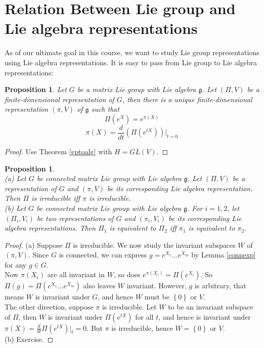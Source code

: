 \documentclass[11pt]{book}
\newtheorem{proposition}[theorem]{Proposition}
\newcommand{\mf}[1]{\mathfrak{#1}}
\begin{document}
\section{Relation Between Lie group and Lie algebra representations}
As of our ultimate goal in this course, we want to study Lie group representations using Lie algebra representations. It is easy to pass from Lie group to Lie algebra representations:
\begin{proposition}
Let $G$ be a matrix Lie group with Lie algebra $\mf{g}$. Let $(\Pi,V)$ be a finite-dimensional representation of $G$, then there is a unique finite-dimensional representation $(\pi,V)$ of $\mf{g}$ such that
$$\Pi(e^X) = e^{\pi(X)}$$
$$\pi(X) = \frac{d}{dt}(\Pi(e^{tX}))  \Big|_{t = 0}$$
\end{proposition}
\begin{proof}
Use Theorem \ref{gptoalg} with $H = GL(V)$.
\end{proof}
\begin{proposition} \mbox{}\\
(a) Let $G$ be connected matrix Lie group with Lie algebra $\mf{g}$. Let $(\Pi,V)$ be a representation of $G$ and $(\pi,V)$ be its corresponding Lie algebra representation. Then $\Pi$ is irreducible iff $\pi$ is irreducible.\\
(b) Let $G$ be connected matrix Lie group with Lie algebra $\mf{g}$. For $i = 1,2$, let $(\Pi_i,V_i)$ be two representations of $G$ and $(\pi_i,V_i)$ be its corresponding Lie algebra representations. Then $\Pi_1$ is equivalent to $\Pi_2$ iff $\pi_1$ is equivalent to $\pi_2$.
\end{proposition}
\begin{proof}
(a) Suppose $\Pi$ is irreducible. We now study the invariant subspaces $W$ of $(\pi,V)$. Since $G$ is connected, we can express $g = e^{X_1}\dots e^{X_m}$ by Lemma \ref{connexp} for any $g \in G$. \\
Now $\pi(X_i)$ are all invariant in $W$, so does $e^{\pi(X_i)} = \Pi(e^{X_i})$. So $\Pi(g) = \Pi(e^{X_1}\dots e^{X_m})$ also leaves $W$ invariant. However, $g$ is arbitrary, that means $W$ is invariant under $G$, and hence $W$ must be $\left\{0\right\}$ or $V$.\\
The other direction, suppose $\pi$ is irreducible. Let $W$ to be an invariant subspace of $\Pi$, then $W$ is invariant under $\Pi(e^{tX})$ for all $t$, and hence is invariant under $\pi(X) = \frac{d}{dt}\Pi(e^{tX})  \Big|_t = 0$. But $\pi$ is irreducible, hence $W = \left\{0\right\}$ or $V$.\\
(b) Exercise.
\end{proof}
\end{document}
